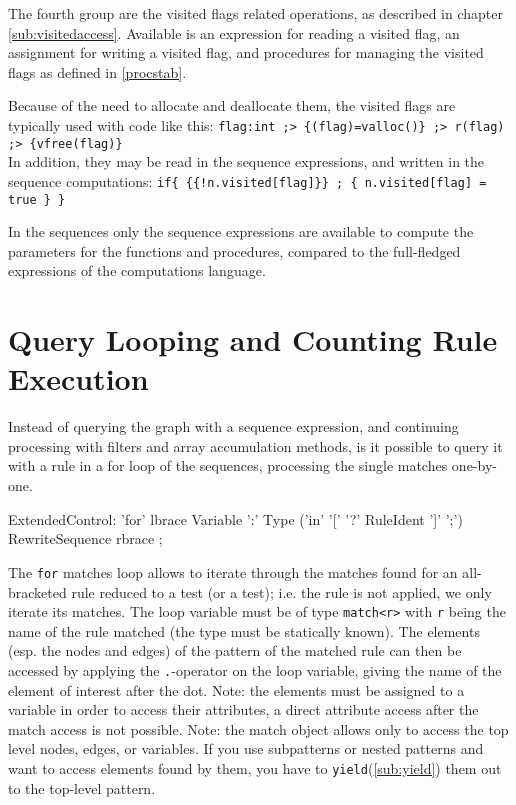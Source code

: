 The fourth group are the visited flags related operations,
as described in chapter \ref{sub:visitedaccess}.
Available is an expression for reading a visited flag, an assignment for writing a visited flag, and procedures for managing the visited flags as defined in \ref{procstab}.

\begin{example}
Because of the need to allocate and deallocate them, the visited flags are typically used with code like this:
\verb#flag:int ;> {(flag)=valloc()} ;> r(flag) ;> {vfree(flag)}#\\
In addition, they may be read in the sequence expressions, and written in the sequence computations:
\verb#if{ {{!n.visited[flag]}} ; { n.visited[flag] = true } }#
\end{example}

In the sequences only the sequence expressions are available to compute the parameters for the functions and procedures, compared to the full-fledged expressions of the computations language.



\section{Query Looping and Counting Rule Execution}

Instead of querying the graph with a sequence expression, and continuing processing with filters and array accumulation methods, is it possible to query it with a rule in a for loop of the sequences, processing the single matches one-by-one.

\begin{rail}
  ExtendedControl:
    'for' lbrace Variable ':' Type
    ('in' '[' '?' RuleIdent ']' ';')\\
    RewriteSequence rbrace
    ;
\end{rail}\label{formatch}

The \texttt{for} matches loop allows to iterate through the matches found for an all-bracketed rule reduced to a test (or a test); i.e. the rule is not applied, we only iterate its matches.
The loop variable must be of type \texttt{match<r>} with \texttt{r} being the name of the rule matched (the type must be statically known).
The elements (esp. the nodes and edges) of the pattern of the matched rule can then be accessed by applying the \texttt{.}-operator on the loop variable, giving the name of the element of interest after the dot.
Note: the elements must be assigned to a variable in order to access their attributes, a direct attribute access after the match access is not possible.
Note: the match object allows only to access the top level nodes, edges, or variables.
If you use subpatterns or nested patterns and want to access elements found by them, you have to \texttt{yield}(\ref{sub:yield}) them out to the top-level pattern.

